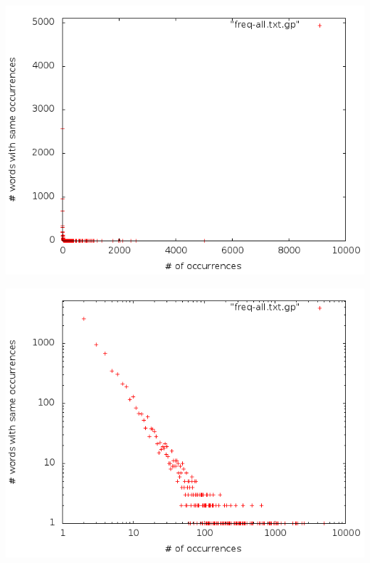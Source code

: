 \begin{frame}[c]
	\includegraphics[scale=0.4]{../task02-04/src/main/resources/results/task3/freq-lin.png}
\end{frame}

\begin{frame}[c]
	\includegraphics[scale=0.4]{../task02-04/src/main/resources/results/task3/freq-log.png}
	\end{frame}	